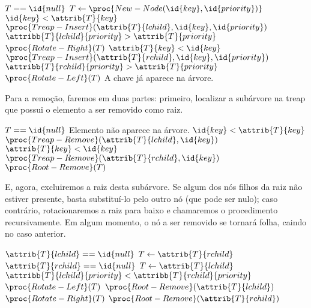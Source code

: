 \begin{codebox}
    \li \If $T == \id{null}$
    \li \Then
            $T \gets \proc{New-Node(\id{key}, \id{priority})}$
    \li \ElseIf $\id{key} < \attrib{T}{key}$
    \li \Then
            $\proc{Treap-Insert}(\attrib{T}{lchild}, \id{key}, \id{priority})$
    \li     \If $\attribb{T}{lchild}{priority} > \attrib{T}{priority}$
    \li         \Then $\proc{Rotate-Right}(T)$
            \End
    \li \ElseIf $\attrib{T}{key} < \id{key}$
    \li \Then
            $\proc{Treap-Insert}(\attrib{T}{rchild}, \id{key}, \id{priority})$
    \li     \If $\attribb{T}{rchild}{priority} > \attrib{T}{priority}$
    \li         \Then $\proc{Rotate-Left}(T)$
            \End
    \li \ElseNoIf
    \li     \Comment A chave já aparece na árvore.
        \End
\end{codebox}

Para a remoção,
faremos em duas partes:
primeiro, localizar a subárvore na treap
que possui o elemento a ser removido como raiz.

\begin{codebox}
    \li \If $T == \id{null}$
    \li \Then \Comment Elemento não aparece na árvore.
    \li \ElseIf $\id{key} < \attrib{T}{key}$
    \li \Then $\proc{Treap-Remove}(\attrib{T}{lchild}, \id{key})$
    \li \ElseIf $\attrib{T}{key} < \id{key}$
    \li \Then $\proc{Treap-Remove}(\attrib{T}{rchild}, \id{key})$
    \li \ElseNoIf
    \li     $\proc{Root-Remove}(T)$
        \End
\end{codebox}

E, agora, excluiremos a raiz desta subárvore.
Se algum dos nós filhos da raiz não estiver presente,
basta substituí-lo pelo outro nó (que pode ser nulo);
caso contrário,
rotacionaremos a raiz para baixo
e chamaremos o procedimento recursivamente.
Em algum momento,
o nó a ser removido se tornará folha,
caindo no caso anterior.

\begin{codebox}
    \li \If $\attrib{T}{lchild} == \id{null}$
    \li \Then $T \gets \attrib{T}{rchild}$
    \li \ElseIf $\attrib{T}{rchild} == \id{null}$
    \li \Then $T \gets \attrib{T}{lchild}$
    \li \ElseIf $\attribb{T}{lchild}{priority} < \attribb{T}{rchild}{priority}$
    \li \Then
            $\proc{Rotate-Left}(T)$
    \li     $\proc{Root-Remove}(\attrib{T}{lchild})$
    \li \ElseNoIf
    \li     $\proc{Rotate-Right}(T)$
    \li     $\proc{Root-Remove}(\attrib{T}{rchild})$
        \End
\end{codebox}
